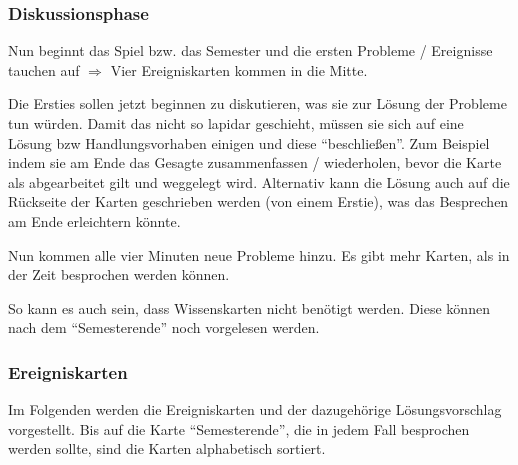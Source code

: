 \documentclass[a4paper,11pt]{scrartcl} %
\begin{document}
\subsubsection{Diskussionsphase}
{
Nun beginnt das Spiel bzw. das Semester und die ersten
Probleme / Ereignisse tauchen auf
$\Rightarrow$ Vier Ereigniskarten kommen in die Mitte.

Die Ersties sollen jetzt beginnen zu diskutieren, was sie 
zur Lösung der Probleme tun würden. Damit das nicht so lapidar geschieht,
müssen sie sich auf eine Lösung bzw Handlungsvorhaben einigen
und diese "`beschließen"'. Zum Beispiel indem sie am Ende das Gesagte zusammenfassen / 
wiederholen, bevor die Karte als abgearbeitet gilt und weggelegt wird.
Alternativ kann die Lösung auch auf die Rückseite der Karten
geschrieben werden (von einem Erstie), was das Besprechen am Ende
erleichtern könnte.

Nun kommen alle vier Minuten neue Probleme hinzu. Es gibt mehr Karten,
als in der Zeit besprochen werden können.

So kann es auch sein, dass Wissenskarten nicht benötigt werden. Diese
können nach dem "`Semesterende"' noch vorgelesen werden.
}





\subsubsection{Ereigniskarten}
Im Folgenden werden die Ereigniskarten und der dazugehörige 
Lösungsvorschlag vorgestellt. Bis auf die Karte "`Semesterende"',
die in jedem Fall besprochen werden sollte, sind
die Karten alphabetisch sortiert.
\end{document}

